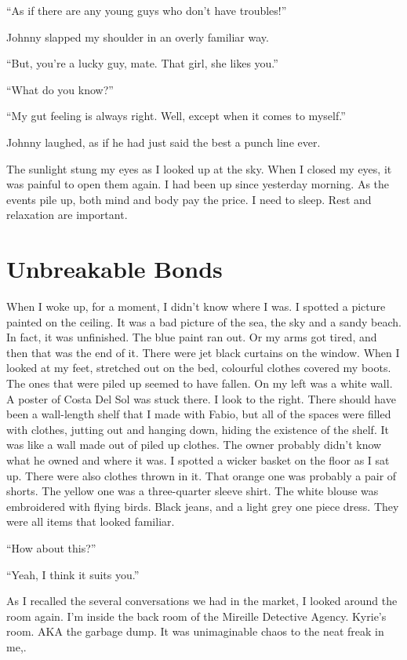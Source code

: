\documentclass[oneside]{book}
\begin{document}
“As if there are any young guys who don’t have troubles!”

Johnny slapped my shoulder in an overly familiar way.

“But, you’re a lucky guy, mate. That girl, she likes you.”

“What do you know?”

“My gut feeling is always right. Well, except when it comes to myself.”

Johnny laughed, as if he had just said the best a punch line ever.

The sunlight stung my eyes as I looked up at the sky. When I closed my eyes, it was painful to open them again. I had been up since yesterday morning. As the events pile up, both mind and body pay the price. I need to sleep. Rest and relaxation are important.

\chapter{Unbreakable Bonds}
When I woke up, for a moment, I didn’t know where I was. I spotted a picture painted on the ceiling. It was a bad picture of the sea, the sky and a sandy beach. In fact, it was unfinished. The blue paint ran out. Or my arms got tired, and then that was the end of it. There were jet black curtains on the window. When I looked at my feet, stretched out on the bed, colourful clothes covered my boots. The ones that were piled up seemed to have fallen. On my left was a white wall. A poster of Costa Del Sol was stuck there. I look to the right. There should have been a wall-length shelf that I made with Fabio, but all of the spaces were filled with clothes, jutting out and hanging down, hiding the existence of the shelf. It was like a wall made out of piled up clothes. The owner probably didn’t know what he owned and where it was. I spotted a wicker basket on the floor as I sat up. There were also clothes thrown in it. That orange one was probably a pair of shorts. The yellow one was a three-quarter sleeve shirt. The white blouse was embroidered with flying birds. Black jeans, and a light grey one piece dress. They were all items that looked familiar.

“How about this?”

“Yeah, I think it suits you.”

As I recalled the several conversations we had in the market, I looked around the room again. I’m inside the back room of the Mireille Detective Agency. Kyrie’s room. AKA the garbage dump. It was unimaginable chaos to the neat freak in me,.
\end{document}
